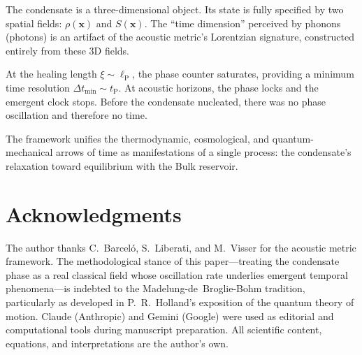 \documentclass[12pt, a4paper]{article}
\newcommand{\lP}{\ell_{\mathrm{P}}}
\newcommand{\tP}{t_{\mathrm{P}}}
\begin{document}
The condensate is a three-dimensional object. Its
state is fully specified by two spatial fields:
$\rho(\mathbf{x})$ and $S(\mathbf{x})$. The ``time
dimension'' perceived by phonons (photons) is an
artifact of the acoustic metric's Lorentzian
signature, constructed entirely from these 3D fields.

At the healing length $\xi \sim \lP$, the phase
counter saturates, providing a minimum time
resolution $\Delta t_{\min} \sim \tP$. At acoustic
horizons, the phase locks and the emergent clock
stops. Before the condensate nucleated, there was
no phase oscillation and therefore no time.

The framework unifies the thermodynamic,
cosmological, and quantum-mechanical arrows of time
as manifestations of a single process: the
condensate's relaxation toward equilibrium with the
Bulk reservoir.


\section*{Acknowledgments}

The author thanks C.~Barcel\'{o}, S.~Liberati, and M.~Visser for the acoustic metric framework. The methodological stance of this paper---treating the condensate phase as a real classical field whose oscillation rate underlies emergent temporal phenomena---is indebted to the Madelung-de~Broglie-Bohm tradition, particularly as developed in P.~R.~Holland's exposition of the quantum theory of motion. Claude (Anthropic) and Gemini (Google) were used as editorial and computational tools during manuscript preparation. All scientific content, equations, and interpretations are the author's own.
\end{document}
